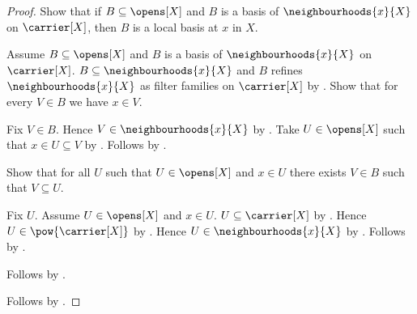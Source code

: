 \begin{proof}
    Show that if $B\subseteq\opens[X]$ and
        $B$ is a basis of $\neighbourhoods{x}{X}$ on $\carrier[X]$, then
        $B$ is a local basis at $x$ in $X$.
    \begin{subproof}
        Assume $B\subseteq\opens[X]$ and
            $B$ is a basis of $\neighbourhoods{x}{X}$ on $\carrier[X]$.
        $B\subseteq\neighbourhoods{x}{X}$ and
            $B$ refines $\neighbourhoods{x}{X}$
                as filter families on $\carrier[X]$
            by .
        Show that for every $V\in B$ we have $x\in V$.
        \begin{subproof}
            Fix $V\in B$.
            Hence $V\in\neighbourhoods{x}{X}$ by .
            Take $U\in\opens[X]$ such that $x\in U\subseteq V$
                by .
            Follows by .
        \end{subproof}
        Show that for all $U$ such that $U\in\opens[X]$ and $x\in U$
            there exists $V\in B$ such that $V\subseteq U$.
        \begin{subproof}
            Fix $U$.
            Assume $U\in\opens[X]$ and $x\in U$.
            $U\subseteq\carrier[X]$ by .
            Hence $U\in\pow{\carrier[X]}$ by .
            Hence $U\in\neighbourhoods{x}{X}$
                by .
            Follows by .
        \end{subproof}
        Follows by .
    \end{subproof}
    Follows by \auto.
\end{proof}

